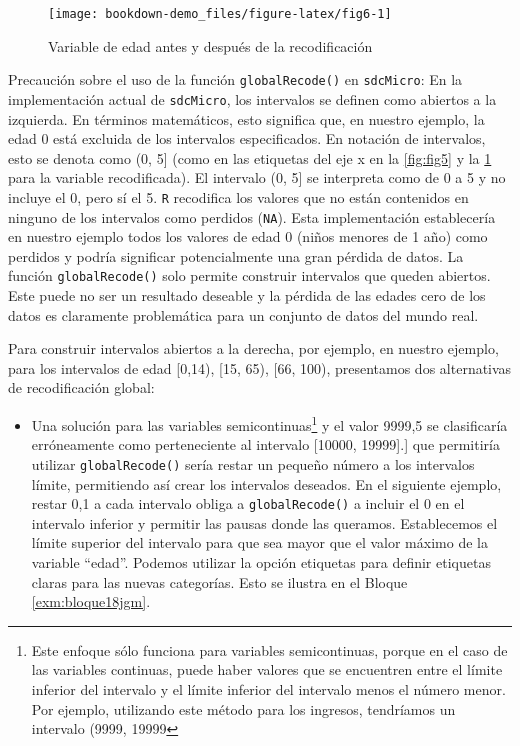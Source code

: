 \documentclass[
]{book}
\providecommand{\tightlist}{%
  \setlength{\itemsep}{0pt}\setlength{\parskip}{0pt}}
\theoremstyle{definition}
\theoremstyle{definition}
\theoremstyle{definition}
\theoremstyle{definition}
\theoremstyle{remark}
\begin{document}
\begin{figure}
\texttt{[image: bookdown-demo\_files/figure-latex/fig6-1]} \caption{Variable de edad antes y después de la recodificación}\label{fig:fig6}
\end{figure}

Precaución sobre el uso de la función \texttt{globalRecode()} en \texttt{sdcMicro}: En la implementación actual de \texttt{sdcMicro}, los intervalos se definen como abiertos a la izquierda. En términos matemáticos, esto significa que, en nuestro ejemplo, la edad 0 está excluida de los intervalos especificados. En notación de intervalos, esto se denota como (0, 5{]} (como en las etiquetas del eje x en la \ref{fig:fig5} y la \ref{fig:fig6} para la variable recodificada). El intervalo (0, 5{]} se interpreta como de 0 a 5 y no incluye el 0, pero sí el 5. \texttt{R} recodifica los valores que no están contenidos en ninguno de los intervalos como perdidos (\texttt{NA}). Esta implementación establecería en nuestro ejemplo todos los valores de edad 0 (niños menores de 1 año) como perdidos y podría significar potencialmente una gran pérdida de datos. La función \texttt{globalRecode()} solo permite construir intervalos que queden abiertos. Este puede no ser un resultado deseable y la pérdida de las edades cero de los datos es claramente problemática para un conjunto de datos del mundo real.

Para construir intervalos abiertos a la derecha, por ejemplo, en nuestro ejemplo, para los intervalos de edad {[}0,14), {[}15, 65), {[}66, 100), presentamos dos alternativas de recodificación global:

\begin{itemize}
\tightlist
\item
  Una solución para las variables semicontinuas\footnote{Este enfoque sólo funciona para variables semicontinuas, porque en el caso de las variables continuas, puede haber valores que se encuentren entre el límite inferior del intervalo y el límite inferior del intervalo menos el número menor. Por ejemplo, utilizando este método para los ingresos, tendríamos un intervalo (9999, 19999} y el valor 9999,5 se clasificaría erróneamente como perteneciente al intervalo {[}10000, 19999{]}.{]} que permitiría utilizar \texttt{globalRecode()} sería restar un pequeño número a los intervalos límite, permitiendo así crear los intervalos deseados. En el siguiente ejemplo, restar 0,1 a cada intervalo obliga a \texttt{globalRecode()} a incluir el 0 en el intervalo inferior y permitir las pausas donde las queramos. Establecemos el límite superior del intervalo para que sea mayor que el valor máximo de la variable ``edad''. Podemos utilizar la opción etiquetas para definir etiquetas claras para las nuevas categorías. Esto se ilustra en el Bloque \ref{exm:bloque18jgm}.
\end{itemize}
\end{document}
